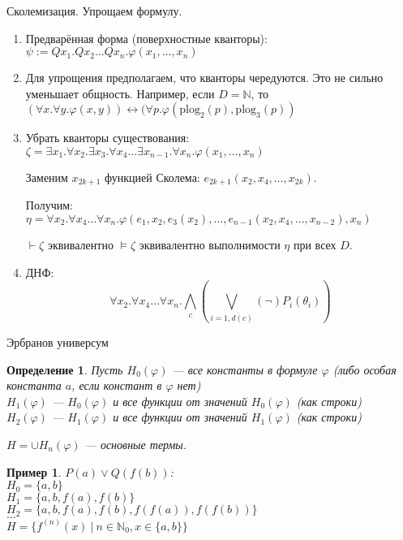 \documentclass[aspectratio=169]{beamer}
\newtheorem{dfn}{Определение}[section]
\newtheorem{exm}{Пример}[section]
\begin{document}
\begin{frame}{Сколемизация. Упрощаем формулу.}
\begin{enumerate}
\item Предварённая форма (поверхностные кванторы):
$\psi := Q x_1.Q x_2\dots Q x_n.\varphi(x_1,\dots,x_n)$

\item Для упрощения предполагаем, что кванторы чередуются.
Это не сильно уменьшает общность. Например, если $D = \mathbb{N}$,
то $(\forall x.\forall y.\varphi(x,y)) \leftrightarrow (\forall p.\varphi(\text{plog}_2(p),\text{plog}_3(p))$

\item Убрать кванторы существования:
$\zeta = \exists x_1.\forall x_2.\exists x_3.\forall x_4\dots\exists x_{n-1}.\forall x_n.\varphi(x_1,\dots,x_n)$

Заменим $x_{2k+1}$ функцией Сколема: $e_{2k+1}(x_2,x_4,\dots,x_{2k})$.

Получим: $\eta = \forall x_2.\forall x_4\dots\forall x_n.\varphi(e_1,x_2,e_3(x_2),\dots,e_{n-1}(x_2,x_4,\dots,x_{n-2}),x_n)$

$\vdash\zeta$ эквивалентно $\models\zeta$ эквивалентно выполнимости $\eta$ при всех $D$.

\item ДНФ:
$$\forall x_2.\forall x_4\dots\forall x_n.\bigwedge_c\left(\bigvee_{i = \overline{1,d(c)}} (\neg)P_i(\theta_i)\right)$$

\end{enumerate}
\end{frame}

\begin{frame}{Эрбранов универсум}
\begin{dfn}Пусть $H_0(\varphi)$ --- все константы в формуле $\varphi$ (либо особая константа $a$, если констант в $\varphi$ нет)\\
$H_1(\varphi)$ --- $H_0(\varphi)$ и все функции от значений $H_0(\varphi)$ (как строки)\\
$H_2(\varphi)$ --- $H_1(\varphi)$ и все функции от значений $H_1(\varphi)$ (как строки)

$H = \cup H_n(\varphi)$ --- основные термы.
\end{dfn}

\begin{exm}$P(a)\vee Q(f(b))$: \\
$H_0 = \{a,b\}$\\
$H_1 = \{a,b,f(a),f(b)\}$\\
$H_2 = \{a,b,f(a),f(b),f(f(a)),f(f(b))\}$\\
$\dots$\\
$H = \{f^{(n)}(x)\ |\ n \in \mathbb{N}_0, x \in \{a,b\}\}$\end{exm}
\end{frame}
\end{document}
